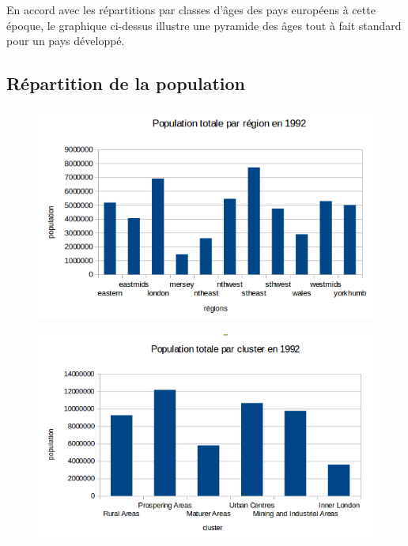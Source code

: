 En accord avec les répartitions par classes d'âges des pays européens à cette époque, le graphique ci-dessus illustre une pyramide des âges tout à fait standard pour un pays développé.
\pagebreak


\subsection{Répartition de la population}

\begin{figure}[h!]
    \centering
    \includegraphics[width=12.8cm ]{images/pop/popRegion.png}
\end{figure}

\begin{figure}[h!]
    \centering
    \includegraphics[width=12.8cm]{images/pop/popCluster.png}
\end{figure}

